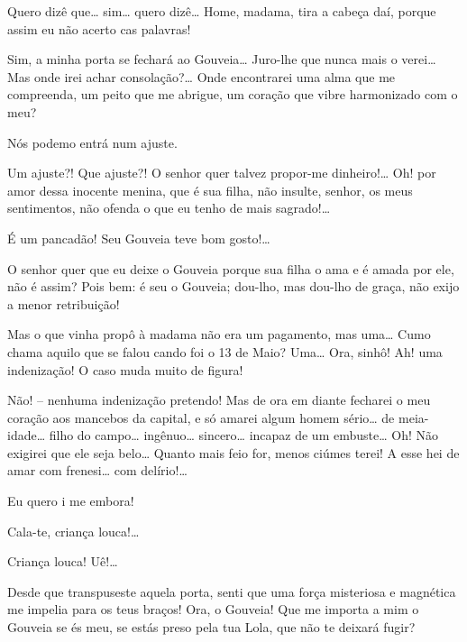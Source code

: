  Quero dizê que\ldots{} sim\ldots{} quero dizê\ldots{} Home, madama, tira a
cabeça daí, porque assim eu não acerto cas palavras!

  Sim, a minha porta se fechará ao Gouveia\ldots{}
Juro-lhe que nunca mais o verei\ldots{} Mas onde irei achar consolação?\ldots{} Onde
encontrarei uma alma que me compreenda, um peito que me abrigue, um coração que vibre
harmonizado com o meu?

 Nós podemo entrá num ajuste.

  Um ajuste?! Que ajuste?! O senhor
quer talvez propor-me dinheiro!\ldots{} Oh! por amor dessa inocente menina, que é sua
filha, não insulte, senhor, os meus sentimentos, não ofenda o que eu tenho de mais
sagrado!\ldots{}

  É um pancadão! Seu Gouveia teve bom gosto!\ldots{}

 O senhor quer que eu deixe o Gouveia porque sua filha o ama e é
amada por ele, não é assim? Pois bem: é seu o Gouveia; dou-lho, mas dou-lho de
graça, não exijo a menor retribuição!

 Mas o que vinha propô à madama não era um pagamento, mas uma\ldots{}
Cumo chama aquilo que se falou cando foi o 13 de Maio? Uma\ldots{} Ora, sinhô!
 Ah! uma indenização! O caso muda muito de figura!

 Não! -- nenhuma indenização pretendo! Mas de ora em diante fecharei o
meu coração aos mancebos da capital, e só amarei  algum homem sério\ldots{} de
meia-idade\ldots{} filho do campo\ldots{} ingênuo\ldots{} sincero\ldots{} incapaz de um embuste\ldots{}  Oh! Não exigirei que ele seja belo\ldots{} Quanto mais feio for, menos ciúmes
terei! 
A esse hei de amar com frenesi\ldots{} com delírio!\ldots{} 

  Eu quero i me embora! 

 Cala-te, criança louca!\ldots{}

 Criança louca! Uê!\ldots{}

  Desde que transpuseste aquela porta, senti que uma
força misteriosa e magnética me impelia para os teus braços! Ora, o
Gouveia! Que me importa a mim o Gouveia se és meu, se estás preso pela tua Lola, que não
te deixará fugir?

